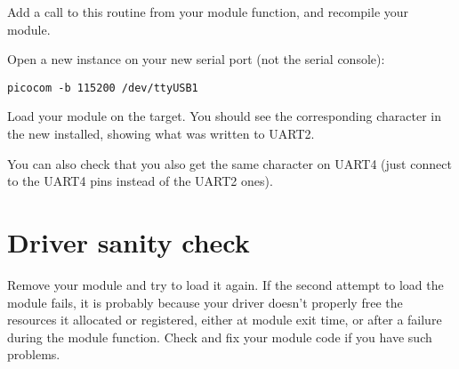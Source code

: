 Add a call to this routine from your module  function,
and recompile your module.

Open a new  instance on your new serial port (not the
serial console):

\begin{verbatim}
picocom -b 115200 /dev/ttyUSB1
\end{verbatim}

Load your module on the target. You should see the
corresponding character in the new  installed,
showing what was written to UART2.

You can also check that you also get the same character on UART4
(just connect to the UART4 pins instead of the UART2 ones).

\section{Driver sanity check}

Remove your module and try to load it again. If the second attempt to
load the module fails, it is probably because your driver doesn't
properly free the resources it allocated or registered, either at module
exit time, or after a failure during the module  function. Check
and fix your module code if you have such problems.
